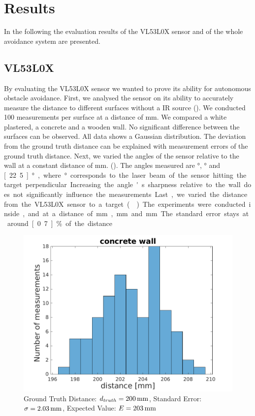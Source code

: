 \chapter{Results}
In the following the evaluation results of the VL53L0X sensor and of the whole avoidance system are presented. 
\section{VL53L0X}
\label{sec:vl53l0x}
By evaluating the VL53L0X sensor we wanted to prove its ability for autonomous obstacle avoidance. First, we analysed the sensor on its ability to accurately measure the distance to different surfaces without a IR source (). We conducted 100 measurements per surface at a distance of \unit[200]{mm}. We compared a white plastered, a concrete and a wooden wall. No significant difference between the surfaces can be observed. All data shows a Gaussian distribution. The deviation from the ground truth distance can be explained with measurement errors of the ground truth distance. Next, we varied the angles of the sensor relative to the wall at a constant distance of \unit[200]{mm}. (). The angles measured are \unit[90]{°}, \unit[45]{°} and \unit[22.5]{°}, where \unit[90]{°} corresponds to the laser beam of the sensor hitting the target perpendicular. Increasing the angle's sharpness relative to the wall does not significantly influence the measurements. Last, we varied the distance from the VL53L0X sensor to a target (). The experiments were conducted inside, and at a distance of \unit[200]{mm}, \unit[500]{mm} and \unit[1000]{mm}. The standard error stays at around \unit[0.7]{\%} of the distance.\\
\begin{figure}
		\centering
		\includegraphics[width=0.9\linewidth]{pictures/concrete_hist.pdf}
		\caption{Ground Truth Distance: $d_{truth}= \unit[200]{mm}$, Standard Error: $\sigma=\unit[2.03]{mm}$, Expected Value: $E=\unit[203]{mm}$}
		\label{fig:surface_hist_con}
\end{figure}
